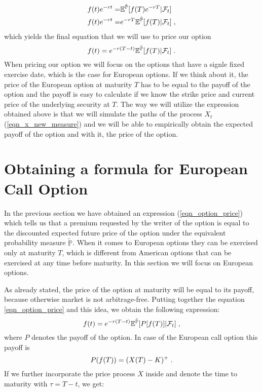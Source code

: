\documentclass[times, utf8, diplomski]{fer}
\begin{document}
\begin{equation*}
	\begin{split}
		f(t)e^{-rt} =& \mathbb{E}^{\tilde{\mathbb{P}}}[f(T)e^{-rT}|\mathcal{F}_t]\\
		f(t)e^{-rt} =& e^{-rT}\mathbb{E}^{\tilde{\mathbb{P}}}[f(T)|\mathcal{F}_t] \hspace{0.1cm},
	\end{split}	
\end{equation*}
which yields the final equation that we will use to price our option
\begin{equation} \label{eqn_option_price}
	f(t) = e^{-r(T-t)} \mathbb{E}^{\tilde{\mathbb{P}}}[f(T)|\mathcal{F}_t] \hspace{0.1cm}.
\end{equation}
When pricing our option we will focus on the options that have a signle fixed exercise date, which is the case for European options. If we think about it, the price of the European option at maturity $T$ has to be equal to the payoff of the option and the payoff is easy to calculate if we know the strike price and current price of the underlying security at $T$. The way we will utilize the expression obtained above is that we will simulate the paths of the process $X_t$ (\ref{eqn_x_new_measure}) and we will be able to empirically obtain the expected payoff of the option and with it, the price of the option.

\section{Obtaining a formula for European Call Option}
In the previous section we have obtained an expression (\ref{eqn_option_price}) which tells us that a premium requested by the writer of the option is equal to the discounted expected future price of the option under the equivalent probability measure $\tilde{\mathbb{P}}$. When it comes to European options they can be exercised only at maturity $T$, which is different from American options that can be exercised at any time before maturity. In this section we will focus on European options. 

\noindent As already stated, the price of the option at maturity will be equal to its payoff, because otherwise market is not arbitrage-free. Putting together the equation \ref{eqn_option_price} and this idea, we obtain the following expression: 
\begin{equation}
	f(t) = e^{-r(T-t)} \mathbb{E}^{\tilde{\mathbb{P}}}[P[f(T)]|\mathcal{F}_t] \hspace{0.1cm},
\end{equation} where $P$ denotes the payoff of the option. In case of the European call option this payoff is $$P(f(T)) = (X(T) - K)^+ \hspace{0.1cm}.$$ If we further incorporate the price process $X$ inside and denote the time to maturity with $\tau = T - t$, we get:
\end{document}
